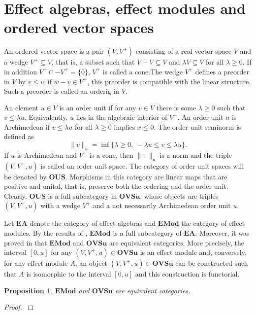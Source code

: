\documentclass[12pt]{article}
\newtheorem{prop}{Proposition}
\newcommand{\<}{\langle}
\theoremstyle{remark}
\newcommand{\ct}[1]{\mathbf{#1}}
\begin{document}
\section{Effect algebras, effect modules and ordered vector spaces}

An ordered vector space is a pair $(V,V^+)$ consisting of a real vector space $V$ and a wedge $V^+\subseteq V$, that is, a subset such that  $V+V\subseteq V$ and $\lambda V\subseteq V$ for all $\lambda\ge 0$. If in addition $V^+\cap -V^+ =\{0\}$, $V^+$ is called a cone.The wedge $V^+$ defines a preorder in $V$ by $v\le w$ if $w-v\in V^+$, this preorder is compatible with the linear structure. Such a preorder is called an orderig in $V$. 

An element $u\in V$ is an order unit if for any $v\in V$ there is some $\lambda\ge 0$ such that $v\le\lambda u$. Equivalently, $u$ lies in the algebraic interior of $V^+$. An order unit $u$ is Archimedean if $v\le \lambda u$ for all $\lambda\ge 0$ implies $x\le 0$. 
The order unit seminorm is defined as
\[
\|v\|_u=\inf\{\lambda\ge 0,\ -\lambda u\le v\le \lambda u\}.
\]
If $u$ is Archimedean and $V^+$ is a cone, then $\|\cdot\|_u$ is a norm and the triple $(V, V^+,u)$ is called an order unit space. 
The category of order unit spaces will be denoted by $\ct{OUS}$. Morphisms in this category are  linear maps that are positive and unital, that is, preserve both the ordering and the order unit. Clearly, $\ct{OUS}$ is a full subcategory in $\ct{OVSu}$, whose objects are  triples $(V,V^+,u)$ with a wedge $V^+$ and a not necessarily Archimedean order unit $u$.

Let $\ct{EA}$ denote the category of effect algebras and $\ct{EMod}$ the category of effect modules. By the results of \cite{sylvia_plus3}, $\ct{EMod}$ is a full subcategory of $\ct{EA}$. Moreover, it was proved in \cite{gud_pulm} that $\ct{EMod}$ and $\ct{OVSu}$ are equivalent categories. More precisely, the interval $[0,u]$ for any $(V,V^+,u)\in \ct{OVSu}$ is an effect module and, conversely, for 
any effect module $A$, an object $(V,V^+,u)\in \ct{OVSu}$ can be constructed such that 
$A$ is isomorphic to the interval  $[0,u]$  and this construction is functorial. 

 

\begin{prop}\label{prop:EMod_OVSu}   $\ct{EMod}$ and $\ct{OVSu}$ are equivalent categories.

\end{prop}

\begin{proof} \cite{sylvia_plus3} 

\end{proof}
\end{document}
